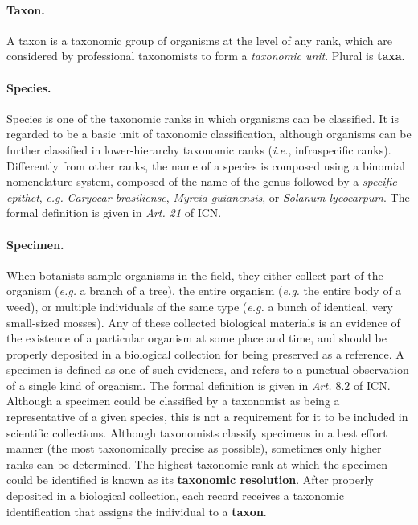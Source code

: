\paragraph*{Taxon.}
A taxon is a taxonomic group of organisms at the level of any rank, which are considered by professional taxonomists to form a \textit{taxonomic unit}. Plural is \textbf{taxa}.

\paragraph*{Species.} %
Species is one of the taxonomic ranks in which organisms can be classified. It is regarded to be a basic unit of taxonomic classification, although organisms can be further classified in lower-hierarchy taxonomic ranks (\textit{i.e.}, infraspecific ranks).
Differently from other ranks, the name of a species is composed using a binomial nomenclature system, composed of the name of the genus followed by a \textit{specific epithet}, \textit{e.g.} \textit{Caryocar brasiliense}, \textit{Myrcia guianensis}, or \textit{Solanum lycocarpum}.
The formal definition is given in \textit{Art. 21} of ICN.

\paragraph*{Specimen.}
When botanists sample organisms in the field, they either collect part of the organism (\textit{e.g.} a branch of a tree), the entire organism (\textit{e.g.} the entire body of a weed), or multiple individuals of the same type (\textit{e.g.} a bunch of identical, very small-sized mosses). 
Any of these collected biological materials is an evidence of the existence of a particular organism at some place and time, and should be properly deposited in a biological collection for being preserved as a reference. 
A specimen is defined as one of such evidences, and refers to a punctual observation of a single kind of organism. 
The formal definition is given in \textit{Art. $8.2$} of ICN. 
Although a specimen could be classified by a taxonomist as being a representative of a given species, this is not a requirement for it to be included in scientific collections. Although taxonomists classify specimens in a best effort manner (the most taxonomically precise as possible), sometimes only higher ranks can be determined. The highest taxonomic rank at which the specimen could be identified is known as its \textbf{taxonomic resolution}.
After properly deposited in a biological collection, each record receives a taxonomic identification that assigns the individual to a \textbf{taxon}.



